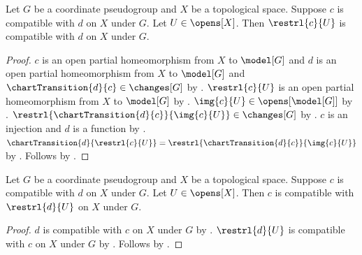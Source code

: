 \begin{theorem}\label{coordinate_compatibility_restrict_left}
    Let $G$ be a coordinate pseudogroup and $X$ be a topological space.
    Suppose $c$ is compatible with $d$ on $X$ under $G$.
    Let $U\in\opens[X]$.
    Then $\restrl{c}{U}$ is compatible with $d$ on $X$ under $G$.
\end{theorem}
\begin{proof}
    $c$ is an open partial homeomorphism from $X$ to $\model[G]$ and
        $d$ is an open partial homeomorphism from $X$ to $\model[G]$ and
        $\chartTransition{d}{c}\in\changes[G]$ by .
    $\restrl{c}{U}$ is an open partial homeomorphism from $X$ to $\model[G]$ by
        .
    $\img{c}{U}\in\opens[\model[G]]$ by .
    $\restrl{\chartTransition{d}{c}}{\img{c}{U}}\in\changes[G]$ by .
    $c$ is an injection and $d$ is a function by
        .
    $\chartTransition{d}{\restrl{c}{U}}=\restrl{\chartTransition{d}{c}}{\img{c}{U}}$ by
        .
    Follows by .
\end{proof}

\begin{theorem}\label{coordinate_compatibility_restrict_right}
    Let $G$ be a coordinate pseudogroup and $X$ be a topological space.
    Suppose $c$ is compatible with $d$ on $X$ under $G$.
    Let $U\in\opens[X]$.
    Then $c$ is compatible with $\restrl{d}{U}$ on $X$ under $G$.
\end{theorem}
\begin{proof}
    $d$ is compatible with $c$ on $X$ under $G$ by .
    $\restrl{d}{U}$ is compatible with $c$ on $X$ under $G$ by
        .
    Follows by .
\end{proof}

